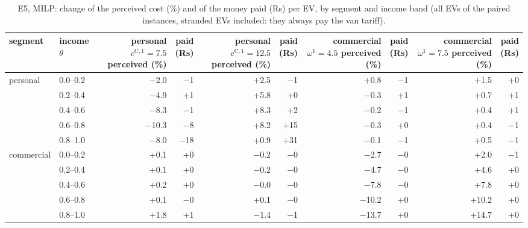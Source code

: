 \begin{table}[H]\centering
\scriptsize
\caption{E5, MILP: change of the perceived cost (\%) and of the money paid (Rs) per EV, by segment and income band (all EVs of the paired instances, stranded EVs included: they always pay the van tariff).}\label{tab:eqE5}
\begin{adjustbox}{max width=\textwidth}\begin{tabular}{llrrrrrrrr}\toprule
segment & income $\theta$ & \shortstack{personal $c^{\mathrm C,1}=7.5$\\perceived (\%)} & \shortstack{paid\\(Rs)} & \shortstack{personal $c^{\mathrm C,1}=12.5$\\perceived (\%)} & \shortstack{paid\\(Rs)} & \shortstack{commercial $\omega^{1}=4.5$\\perceived (\%)} & \shortstack{paid\\(Rs)} & \shortstack{commercial $\omega^{1}=7.5$\\perceived (\%)} & \shortstack{paid\\(Rs)} \\ \midrule
personal & 0.0--0.2 & $-$2.0 & $-$1 & +2.5 & $-$1 & +0.8 & $-$1 & +1.5 & +0 \\
 & 0.2--0.4 & $-$4.9 & +1 & +5.8 & +0 & $-$0.3 & +1 & +0.7 & +1 \\
 & 0.4--0.6 & $-$8.3 & $-$1 & +8.3 & +2 & $-$0.2 & $-$1 & +0.4 & +1 \\
 & 0.6--0.8 & $-$10.3 & $-$8 & +8.2 & +15 & $-$0.3 & +0 & +0.4 & $-$1 \\
 & 0.8--1.0 & $-$8.0 & $-$18 & +0.9 & +31 & $-$0.1 & $-$1 & +0.5 & $-$1 \\
commercial & 0.0--0.2 & +0.1 & +0 & $-$0.2 & $-$0 & $-$2.7 & $-$0 & +2.0 & $-$1 \\
 & 0.2--0.4 & +0.1 & +0 & $-$0.2 & $-$0 & $-$4.7 & $-$0 & +4.6 & +0 \\
 & 0.4--0.6 & +0.2 & +0 & $-$0.0 & $-$0 & $-$7.8 & $-$0 & +7.8 & +0 \\
 & 0.6--0.8 & +0.1 & $-$0 & +0.1 & $-$0 & $-$10.2 & +0 & +10.2 & +0 \\
 & 0.8--1.0 & +1.8 & +1 & $-$1.4 & $-$1 & $-$13.7 & +0 & +14.7 & +0 \\
\bottomrule\end{tabular}\end{adjustbox}\end{table}
